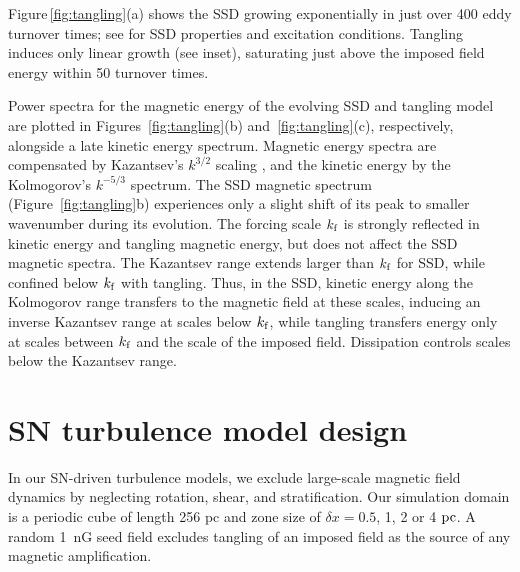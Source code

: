 \documentclass[preprint2]{aastex63}
\newcommand\kf{k_{\rm f} }
\newcommand\pc{~ {\rm pc}}
\begin{document}
 Figure\,\ref{fig:tangling}(a) shows the SSD growing exponentially in just over 400
 eddy turnover times; see \cite{ZRS83} for SSD properties and excitation
 conditions.
 Tangling induces only linear growth (see inset), saturating just above
 the imposed field energy within 50 turnover times.

 Power spectra for the magnetic energy of the evolving SSD and
 tangling model are plotted
 in Figures~\ref{fig:tangling}(b) and~\ref{fig:tangling}(c), respectively,
 alongside a late kinetic energy spectrum.
 Magnetic energy spectra are compensated by Kazantsev's $k^{3/2}$
 scaling \citep{Sch02,BS14}, and the kinetic energy by the
 Kolmogorov's $k^{-5/3}$ spectrum.
 The SSD magnetic spectrum (Figure~\ref{fig:tangling}b) 
     experiences only a slight shift of its peak to smaller wavenumber
     during its evolution.
 The forcing scale $\kf$ is strongly reflected in kinetic energy and tangling 
 magnetic energy, but does not affect the SSD magnetic
 spectra.
 The Kazantsev range extends larger than $\kf$ for SSD, while
 confined below $\kf$ with tangling.
 Thus, in the SSD, kinetic energy along the Kolmogorov range transfers to
 the magnetic field at these scales, inducing an inverse Kazantsev range
 at scales below $\kf$, while tangling transfers energy only at scales between
 $\kf$ and the scale of the imposed field.
 Dissipation controls scales below the Kazantsev range. 
 
\section{SN turbulence model design} \label{sec:model}

 In our SN-driven turbulence models, we exclude large-scale magnetic
 field dynamics by neglecting rotation, shear, and stratification. Our
 simulation domain is a periodic cube of length 256 pc and zone size
 of $\delta x=0.5$, 1, 2 or 4$\pc$.
 A random 1~nG seed field excludes tangling of an imposed field as the 
 source of any magnetic amplification.
\end{document}
